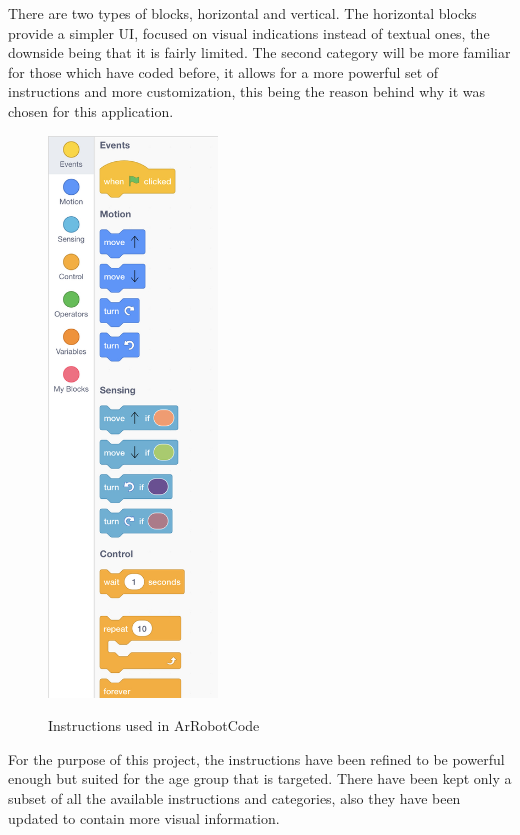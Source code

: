 \documentclass[12 pct]{report}
\begin{document}
There are two types of blocks, horizontal and vertical. The horizontal blocks provide a simpler UI, focused on visual indications instead of textual ones, the downside being that it is fairly limited. The second category will be more familiar for those which have coded before, it allows for a more powerful set of instructions and more customization, this being the reason behind why it was chosen for this application.

\begin{figure}[H]
\includegraphics[width=0.4\textwidth]{allInstructions}
\centering
\label{fig:hololens}
\caption{Instructions used in ArRobotCode}
\end{figure}

For the purpose of this project, the instructions have been refined to be powerful enough but suited for the age group that is targeted. There have been kept only a subset of all the available instructions and categories, also they have been updated to contain more visual information. 
\end{document}
